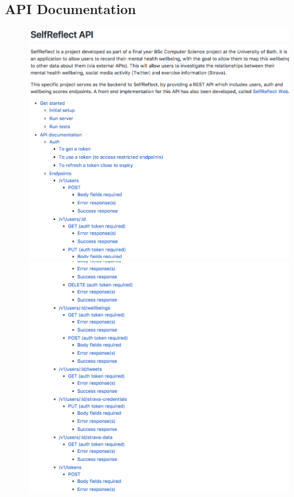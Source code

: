\documentclass[11pt,openright,a4paper]{report}
\begin{document}
\begin{appendices}
\section{API Documentation} \label{app:apidocs}
\begin{figure}[ht]
  \centering
  \includegraphics[width=.9\textwidth]{i/apidocs1.png}
  \includegraphics[width=.9\textwidth]{i/apidocs2.png}
\end{figure}


\end{appendices}
\end{document}
